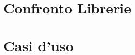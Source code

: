 \documentclass[../main.tex]{subfiles}
\begin{document}
\section{Confronto Librerie}
\section{Casi d'uso}
\end{document}
